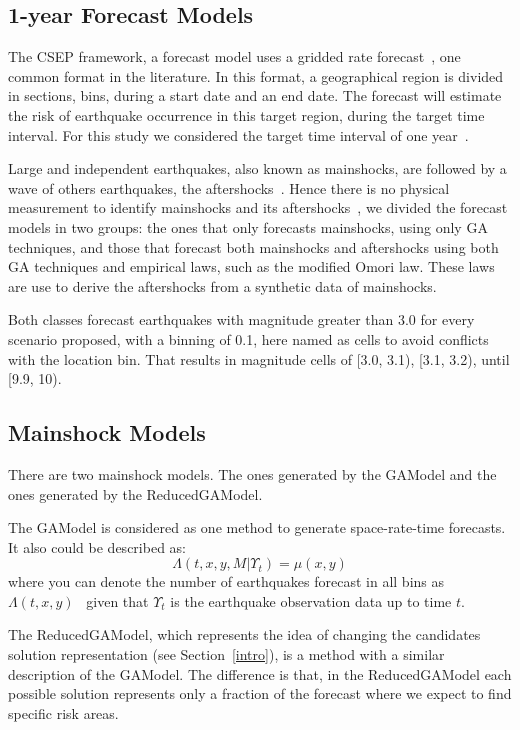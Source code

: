 \subsection{1-year Forecast Models}
The CSEP framework, a forecast model uses a gridded rate
forecast~\cite{zechar2010evaluating}, one common format in the
literature. In this format, a geographical region is divided in
sections, bins, during a start date and an end date. The forecast will
estimate the risk of earthquake occurrence in this target region, during the target time interval. For
this study we considered the target time interval of one
year~\cite{ecta14}.

Large and independent earthquakes, also known as mainshocks, are
followed by a wave of others earthquakes, the
aftershocks~\cite{schorlemmer2010first}. Hence there is no physical
measurement to identify mainshocks and its
aftershocks~\cite{schorlemmer2010first}, we divided the forecast
models in two groups: the ones that only forecasts mainshocks, using only GA techniques, and those that forecast both mainshocks and aftershocks using both GA techniques and empirical laws, such as the modified Omori law. These laws are use to derive the aftershocks from a synthetic data of mainshocks. 

Both classes forecast earthquakes with magnitude greater than 3.0 for
every scenario proposed, with a binning of 0.1, here named as cells to
avoid conflicts with the location bin. That results in magnitude cells
of [3.0, 3.1), [3.1, 3.2), until [9.9, 10). 


\subsection{Mainshock Models}\label{mainshocksMethods}
There are two mainshock models. The ones generated by the GAModel and the ones generated by the ReducedGAModel.

The GAModel is considered as one method to generate
space-rate-time forecasts. It also could be described as:
\begin{equation}\label{gamodel}
 \Lambda(t,x,y,M|\Upsilon_t) = \mu(x,y)
\end{equation}
where you can denote the number of earthquakes forecast in all bins 
as $\Lambda(t,x,y)$~\cite{zechar2010evaluating} given that $\Upsilon_t$ 
is the earthquake observation data up to time $t$.

The ReducedGAModel, which represents the idea of changing the
candidates solution representation (see Section~\ref{intro}), is a
method with a similar description of the GAModel. The difference is
that, in the ReducedGAModel each possible solution represents only a
fraction of the forecast where we expect to find specific risk areas.


